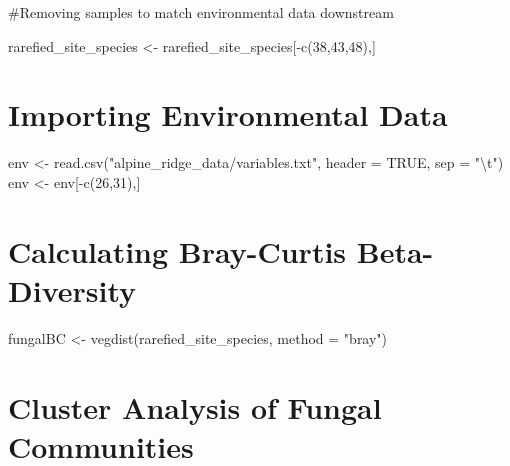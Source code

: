 \documentclass[
]{article}
\newenvironment{Shaded}{\begin{snugshade}}{\end{snugshade}}
\newcommand{\AttributeTok}[1]{\textcolor[rgb]{0.77,0.63,0.00}{#1}}
\newcommand{\ConstantTok}[1]{\textcolor[rgb]{0.00,0.00,0.00}{#1}}
\newcommand{\DecValTok}[1]{\textcolor[rgb]{0.00,0.00,0.81}{#1}}
\newcommand{\FunctionTok}[1]{\textcolor[rgb]{0.00,0.00,0.00}{#1}}
\newcommand{\NormalTok}[1]{#1}
\newcommand{\OtherTok}[1]{\textcolor[rgb]{0.56,0.35,0.01}{#1}}
\newcommand{\SpecialCharTok}[1]{\textcolor[rgb]{0.00,0.00,0.00}{#1}}
\newcommand{\StringTok}[1]{\textcolor[rgb]{0.31,0.60,0.02}{#1}}
\begin{document}
\#Removing samples to match environmental data downstream

\begin{Shaded}
\begin{Highlighting}[]
\NormalTok{rarefied\_site\_species }\OtherTok{\textless{}{-}}\NormalTok{ rarefied\_site\_species[}\SpecialCharTok{{-}}\FunctionTok{c}\NormalTok{(}\DecValTok{38}\NormalTok{,}\DecValTok{43}\NormalTok{,}\DecValTok{48}\NormalTok{),]}
\end{Highlighting}
\end{Shaded}

\hypertarget{importing-environmental-data}{%
\section{Importing Environmental
Data}\label{importing-environmental-data}}

\begin{Shaded}
\begin{Highlighting}[]
\NormalTok{env }\OtherTok{\textless{}{-}} \FunctionTok{read.csv}\NormalTok{(}\StringTok{"alpine\_ridge\_data/variables.txt"}\NormalTok{, }\AttributeTok{header =} \ConstantTok{TRUE}\NormalTok{, }\AttributeTok{sep =} \StringTok{"}\SpecialCharTok{\textbackslash{}t}\StringTok{"}\NormalTok{)}
\NormalTok{env }\OtherTok{\textless{}{-}}\NormalTok{ env[}\SpecialCharTok{{-}}\FunctionTok{c}\NormalTok{(}\DecValTok{26}\NormalTok{,}\DecValTok{31}\NormalTok{),]}
\end{Highlighting}
\end{Shaded}

\hypertarget{calculating-bray-curtis-beta-diversity}{%
\section{Calculating Bray-Curtis
Beta-Diversity}\label{calculating-bray-curtis-beta-diversity}}

\begin{Shaded}
\begin{Highlighting}[]
\NormalTok{fungalBC }\OtherTok{\textless{}{-}} \FunctionTok{vegdist}\NormalTok{(rarefied\_site\_species, }\AttributeTok{method =} \StringTok{"bray"}\NormalTok{)}
\end{Highlighting}
\end{Shaded}

\hypertarget{cluster-analysis-of-fungal-communities}{%
\section{Cluster Analysis of Fungal
Communities}\label{cluster-analysis-of-fungal-communities}}
\end{document}
